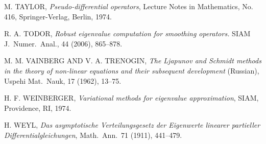 \documentclass[final]{siamltex}
\numberwithin{equation}{section}
\begin{document}
\begin{thebibliography}{xxx}
 M. TAYLOR, \textit{Pseudo-differential operators}, Lecture Notes in Mathematics, No. 416, Springer-Verlag, Berlin, 1974.

 R. A. TODOR, \textit{Robust eigenvalue computation for smoothing operators.} SIAM J.\ Numer.\ Anal., 44 (2006), 865--878.

 M. M. VAINBERG AND V. A. TRENOGIN, \textit{The Ljapunov and Schmidt methods in the theory of non-linear equations and their subsequent development} (Russian), Uspehi Mat.\ Nauk, 17 (1962), 13--75.

 H. F. WEINBERGER, \textit{Variational
methods for eigenvalue approximation}, SIAM, Providence, RI, 1974.

 H. WEYL, \textit{Das asymptotische Verteilungsgesetz der Eigenwerte linearer partieller Differentialgleichungen}, Math.\ Ann.\ 71 (1911), 441--479.

\end{thebibliography}
\end{document}
